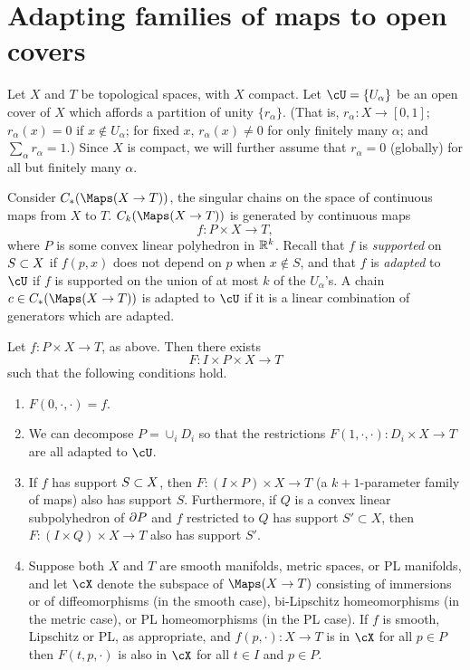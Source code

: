 
\section{Adapting families of maps to open covers}  \label{sec:localising}


Let $X$ and $T$ be topological spaces, with $X$ compact.
Let $\cU = \{U_\alpha\}$ be an open cover of $X$ which affords a partition of
unity $\{r_\alpha\}$.
(That is, $r_\alpha : X \to [0,1]$; $r_\alpha(x) = 0$ if $x\notin U_\alpha$;
for fixed $x$, $r_\alpha(x) \ne 0$ for only finitely many $\alpha$; and $\sum_\alpha r_\alpha = 1$.)
Since $X$ is compact, we will further assume that $r_\alpha = 0$ (globally) 
for all but finitely many $\alpha$.

Consider  $C_*(\Maps(X\to T))$, the singular chains on the space of continuous maps from $X$ to $T$.
$C_k(\Maps(X \to T))$ is generated by continuous maps
\[
	f: P\times X \to T ,
\]
where $P$ is some convex linear polyhedron in $\mathbb{R}^k$.
Recall that $f$ is {\it supported} on $S\subset X$ if $f(p, x)$ does not depend on $p$ when
$x \notin S$, and that $f$ is {\it adapted} to $\cU$ if 
$f$ is supported on the union of at most $k$ of the $U_\alpha$'s.
A chain $c \in C_*(\Maps(X \to T))$ is adapted to $\cU$ if it is a linear combination of 
generators which are adapted.

\begin{lemma} \label{basic_adaptation_lemma}
Let $f: P\times X \to T$, as above.
Then there exists
\[
	F: I \times P\times X \to T
\]
such that the following conditions hold.
\begin{enumerate}
\item $F(0, \cdot, \cdot) = f$.
\item We can decompose $P = \cup_i D_i$ so that
the restrictions $F(1, \cdot, \cdot) : D_i\times X\to T$ are all adapted to $\cU$.
\item If $f$ has support $S\subset X$, then
$F: (I\times P)\times X\to T$ (a $k{+}1$-parameter family of maps) also has support $S$.
Furthermore, if $Q$ is a convex linear subpolyhedron of $\partial P$ and $f$ restricted to $Q$
has support $S' \subset X$, then
$F: (I\times Q)\times X\to T$ also has support $S'$.
\item Suppose both $X$ and $T$ are smooth manifolds, metric spaces, or PL manifolds, and 
let $\cX$ denote the subspace of $\Maps(X \to T)$ consisting of immersions or of diffeomorphisms (in the smooth case), 
bi-Lipschitz homeomorphisms (in the metric case), or PL homeomorphisms (in the PL case).
 If $f$ is smooth, Lipschitz or PL, as appropriate, and $f(p, \cdot):X\to T$ is in $\cX$ for all $p \in P$
then $F(t, p, \cdot)$ is also in $\cX$ for all $t\in I$ and $p\in P$.
\end{enumerate}
\end{lemma}

